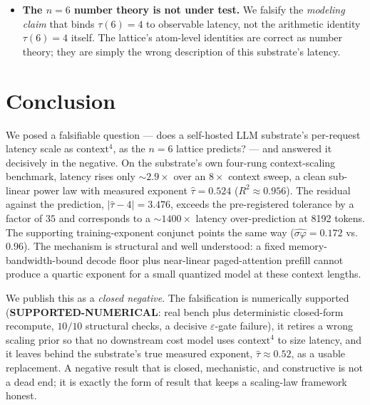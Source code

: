 \documentclass[11pt,a4paper]{article}
\newcommand{\green}[1]{\textcolor{green!50!black}{\textbf{#1}}}
\newcommand{\taum}{\ensuremath{\hat{\tau}}}
\begin{document}
\begin{itemize}
    flattens the curve is, in part, a consequence of \texttt{max\_tokens} =
    \(64\). A workload with much longer outputs would weight decode more heavily
    --- but decode is itself context-invariant per token, so a longer output
    would raise the floor uniformly and lower, not raise, the context exponent.
    The choice is honest and, if anything, conservative against the lattice.
  \item \textbf{The \(n{=}6\) number theory is not under test.} We falsify the
    \emph{modeling claim} that binds \(\tau(6) = 4\) to observable latency, not
    the arithmetic identity \(\tau(6) = 4\) itself. The lattice's atom-level
    identities are correct as number theory; they are simply the wrong
    description of this substrate's latency.
\end{itemize}

\section{Conclusion}
\label{sec:conclusion}

We posed a falsifiable question --- does a self-hosted LLM substrate's
per-request latency scale as \(\mathrm{context}^4\), as the \(n{=}6\) lattice
predicts? --- and answered it decisively in the negative. On the substrate's own
four-rung context-scaling benchmark, latency rises only \(\sim\!2.9\times\) over
an \(8\times\) context sweep, a clean sub-linear power law with measured
exponent \(\taum = 0.524\) (\(R^2 \approx 0.956\)). The residual against the
prediction, \(|\taum - 4| = 3.476\), exceeds the pre-registered tolerance by a
factor of \(35\) and corresponds to a \(\sim\!1400\times\) latency
over-prediction at \num{8192} tokens. The supporting training-exponent conjunct
points the same way (\(\hat{\sigma\varphi} = 0.172\) vs.\ \(0.96\)). The
mechanism is structural and well understood: a fixed memory-bandwidth-bound
decode floor plus near-linear paged-attention prefill cannot produce a quartic
exponent for a small quantized model at these context lengths.

We publish this as a \emph{closed negative}. The falsification is numerically
supported (\green{SUPPORTED-NUMERICAL}: real bench plus deterministic
closed-form recompute, \(10/10\) structural checks, a decisive
\(\varepsilon\)-gate failure), it retires a wrong scaling prior so that no
downstream cost model uses \(\mathrm{context}^4\) to size latency, and it leaves
behind the substrate's true measured exponent, \(\taum \approx 0.52\), as a
usable replacement. A negative result that is closed, mechanistic, and
constructive is not a dead end; it is exactly the form of result that keeps a
scaling-law framework honest.
\end{document}
